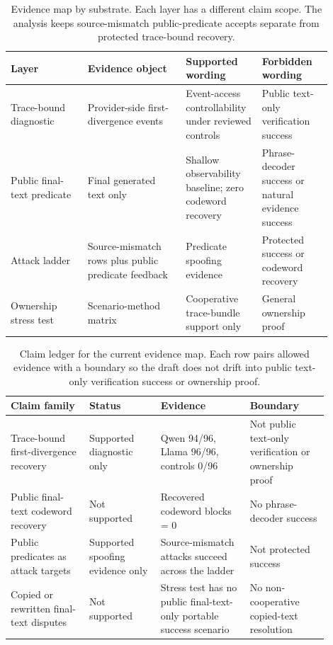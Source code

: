 \begin{table}[t]
\centering
\scriptsize
\setlength{\tabcolsep}{3pt}
\begin{tabular}{p{0.22\linewidth}p{0.28\linewidth}p{0.20\linewidth}p{0.20\linewidth}}
\toprule
Layer & Evidence object & Supported wording & Forbidden wording \\
\midrule
Trace-bound diagnostic & Provider-side first-divergence events & Event-access controllability under reviewed controls & Public text-only verification success \\
Public final-text predicate & Final generated text only & Shallow observability baseline; zero codeword recovery & Phrase-decoder success or natural evidence success \\
Attack ladder & Source-mismatch rows plus public predicate feedback & Predicate spoofing evidence & Protected success or codeword recovery \\
Ownership stress test & Scenario-method matrix & Cooperative trace-bundle support only & General ownership proof \\
\bottomrule
\end{tabular}
\caption{Evidence map by substrate.  Each layer has a different claim scope.
The analysis keeps source-mismatch public-predicate accepts separate from
protected trace-bound recovery.}
\label{tab:evidence-map}
\end{table}

\begin{table}[t]
\centering
\scriptsize
\setlength{\tabcolsep}{3pt}
\renewcommand{\arraystretch}{1.12}
\begin{tabular}{p{0.22\linewidth}p{0.20\linewidth}p{0.25\linewidth}p{0.22\linewidth}}
\toprule
Claim family & Status & Evidence & Boundary \\
\midrule
Trace-bound first-divergence recovery & Supported diagnostic only & Qwen 94/96, Llama 96/96, controls 0/96 & Not public text-only verification or ownership proof \\
Public final-text codeword recovery & Not supported & Recovered codeword blocks = 0 & No phrase-decoder success \\
Public predicates as attack targets & Supported spoofing evidence only & Source-mismatch attacks succeed across the ladder & Not protected success \\
Copied or rewritten final-text disputes & Not supported & Stress test has no public final-text-only portable success scenario & No non-cooperative copied-text resolution \\
\bottomrule
\end{tabular}
\caption{Claim ledger for the current evidence map.  Each row pairs allowed
evidence with a boundary so the draft does not drift into public text-only
verification success or ownership proof.}
\label{tab:claim-ledger}
\end{table}

